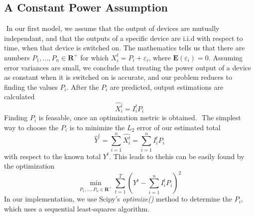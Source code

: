 \documentclass{article}
\begin{document}
\subsection{A Constant Power Assumption}
​
In our first model, we assume that the output of devices are mutually independant, and that the outputs of a specific device are i.i.d with respect to time, when that device is switched on. The mathematics tells us that there are numbers $P_1, \dots, P_n \in \mathbf{R}^+$ for which $X_i^t = P_i + \varepsilon_i$, where $\mathbf{E}(\varepsilon_i) = 0$. Assuming error variances are small, we conclude that treating the power output of a device as constant when it is switched on is accurate, and our problem reduces to finding the values $P_i$. After the $P_i$ are predicted, output estimations are calculated
%
\[ \hat{X_i^t} = I_i^t P_i \]
%
Finding $P_i$ is feasable, once an optimization metric is obtained.
​
The simplest way to choose the $P_i$ is to minimize the $L_2$ error of our estimated total
%
\[ \hat{Y}^t = \sum_{i = 1}^n \hat{X_i^t} = \sum_{i = 1}^n I_i^t P_i \]
%
with respect to the known total $Y^t$. This leads to thehis can be easily found by the optimization
%
\[ \min_{P_1, \dots, P_n \in \mathbf{R}^+} \sum_{t = 1}^T \left( Y^t - \sum_{i = 1}^n I_i^t P_i \right)^2 \]
%
In our implementation, we use Scipy's {\it optimize()} method to determine the $P_i$, which uses a sequential least-squares algorithm.
​
\end{document}
